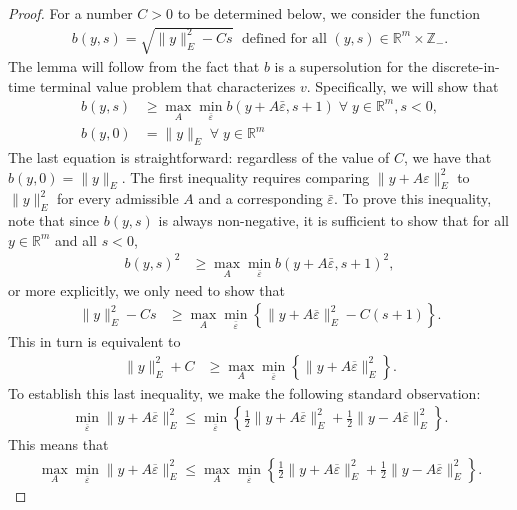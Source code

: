 \documentclass[reqno]{amsart}
\numberwithin{equation}{section}
\begin{document}
\begin{proof}
For a number $C>0$ to be determined below, we consider the function
\begin{align*}
  b(y,s) = \sqrt{\|y\|_E^2-Cs}\;\text{ defined for all } (y,s) \in \mathbb{R}^m\times \mathbb{Z}_-.
\end{align*}
The lemma will follow from the fact that $b$ is a supersolution for the discrete-in-time terminal value problem that characterizes $v$. Specifically, we will show that
\begin{align*}
  b(y,s) & \geq \max_{A}\min_{\bar \varepsilon} b(y+A\bar \varepsilon,s+1)\;\forall\;y\in\mathbb{R}^m, s<0,\\
  b(y,0) & = \|y\|_E\;\forall\;y\in\mathbb{R}^m
\end{align*}
The last equation is straightforward: regardless of the value of $C$, we have that $b(y,0) = \|y\|_E$. The first  inequality requires comparing $\|y+A\varepsilon\|^2_E$ to $\|y\|^2_E$ for every admissible $A$ and a corresponding $\bar \varepsilon$. To prove this inequality,  note that since $b(y,s)$ is always non-negative, it is sufficient to show that for all $y\in\mathbb{R}^m$ and all $s<0$,
\begin{align*}
  b(y,s)^2 & \geq \max_{A}\min_{\bar \varepsilon} b(y+A\bar \varepsilon,s+1)^2,
\end{align*}
or more explicitly, we only need to show that 
\begin{align*}
  \|y\|_E^2-Cs & \geq \max_{A}\min_{\bar \varepsilon} \left \{ \|y+A\overline \varepsilon\|_E^2-C(s+1) \right \}.
\end{align*}
This in turn is equivalent to
\begin{align*}
  \|y\|_E^2+C& \geq \max_{A}\min_{\bar \varepsilon} \left \{ \|y+A\overline \varepsilon\|_E^2 \right \}.
\end{align*}
To establish this last inequality, we make the following standard observation:
\begin{align*}
  \min_{\overline \varepsilon} \|y+A\overline \varepsilon\|^2_E \leq \min_{\overline \varepsilon} \left \{ \tfrac{1}{2}\|y+A\overline \varepsilon\|^2_E + \tfrac{1}{2}\|y-A\overline \varepsilon\|^2_E \right \}.
\end{align*}
This means that
\begin{align*}
  \max_A \min_{\overline \varepsilon} \|y+A\overline \varepsilon\|_E^2 \leq \max_A \min_{\overline \varepsilon} \left \{ \tfrac{1}{2}\|y+A\overline \varepsilon\|^2_E + \tfrac{1}{2}\|y-A\overline \varepsilon\|^2_E \right \}.
\end{align*}

\end{proof}
\end{document}
